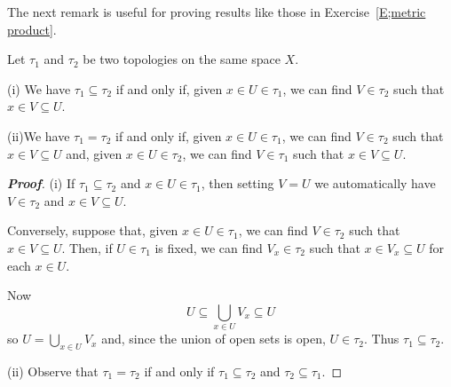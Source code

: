 The next remark is useful for proving results like those in Exercise~\ref{E;metric product}.



\begin{theorem}\label{L;same topology}
Let $\tau_{1}$ and $\tau_{2}$ be two topologies on the same space $X$.

(i) We have $\tau_{1}\subseteq\tau_{2}$ if and only if, given $x\in U\in\tau_{1}$, we can find $V\in\tau_{2}$ such that $x\in V\subseteq U$.

(ii)We have $\tau_{1}=\tau_{2}$ if and only if, given $x\in U\in\tau_{1}$, we can find $V\in\tau_{2}$ such that $x\in V\subseteq U$ and, given $x\in U\in\tau_{2}$, we can find $V\in\tau_{1}$ such that $x\in V\subseteq U$.
\end{theorem}

\begin{proof}[\bf Proof] (i) If $\tau_{1}\subseteq\tau_{2}$
and $x\in U\in\tau_{1}$, then setting $V=U$ we
automatically
have $V\in\tau_{2}$ and $x\in V\subseteq U$.

Conversely, suppose that,
given $x\in U\in\tau_{1}$, we can find
$V\in\tau_{2}$ such that $x\in V\subseteq U$.
Then, if $U\in\tau_{1}$ is fixed, we can find
$V_{x}\in\tau_{2}$ such that $x\in V_{x}\subseteq U$
for each $x\in U$.

Now
\[
U\subseteq \bigcup_{x\in U}V_{x}\subseteq U
\]
so $U=\bigcup_{x\in U}V_{x}$ and, since the union of open sets is open, $U\in\tau_{2}$. Thus $\tau_{1}\subseteq \tau_{2}$.

(ii) Observe that $\tau_{1}=\tau_{2}$ if and only if $\tau_{1}\subseteq\tau_{2}$ and $\tau_{2}\subseteq\tau_{1}$.
\end{proof}



